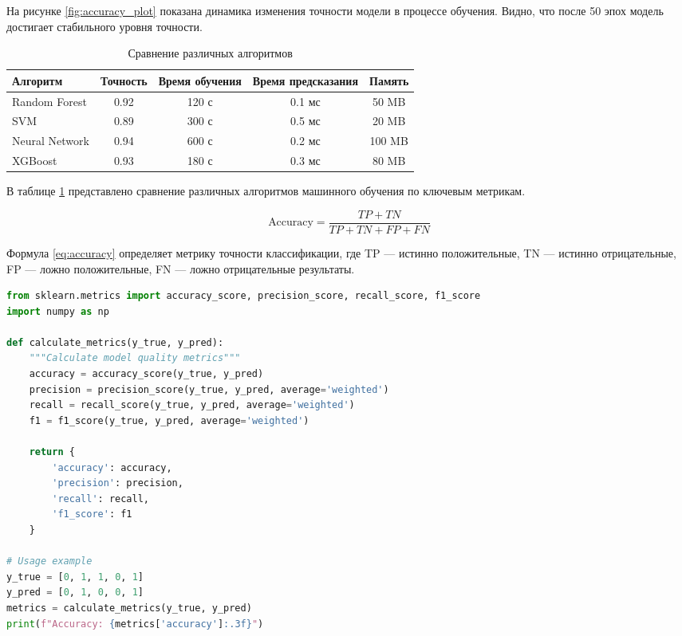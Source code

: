 На рисунке \ref{fig:accuracy_plot} показана динамика изменения точности модели в процессе обучения. Видно, что после 50 эпох модель достигает стабильного уровня точности.

\begin{table}[H]
\centering
\caption{Сравнение различных алгоритмов}
\label{tab:algorithm_comparison}
\begin{tabular}{|l|c|c|c|c|}
\hline
\textbf{Алгоритм} & \textbf{Точность} & \textbf{Время обучения} & \textbf{Время предсказания} & \textbf{Память} \\
\hline
Random Forest & 0.92 & 120 с & 0.1 мс & 50 MB \\
SVM & 0.89 & 300 с & 0.5 мс & 20 MB \\
Neural Network & 0.94 & 600 с & 0.2 мс & 100 MB \\
XGBoost & 0.93 & 180 с & 0.3 мс & 80 MB \\
\hline
\end{tabular}
\end{table}

В таблице \ref{tab:algorithm_comparison} представлено сравнение различных алгоритмов машинного обучения по ключевым метрикам.

\begin{equation}
\text{Accuracy} = \frac{TP + TN}{TP + TN + FP + FN}
\label{eq:accuracy}
\end{equation}

Формула \ref{eq:accuracy} определяет метрику точности классификации, где TP — истинно положительные, TN — истинно отрицательные, FP — ложно положительные, FN — ложно отрицательные результаты.

\begin{lstlisting}[style=code, language=Python, caption={Код для вычисления метрик}, label={lst:metrics_calculation}]
from sklearn.metrics import accuracy_score, precision_score, recall_score, f1_score
import numpy as np

def calculate_metrics(y_true, y_pred):
    """Calculate model quality metrics"""
    accuracy = accuracy_score(y_true, y_pred)
    precision = precision_score(y_true, y_pred, average='weighted')
    recall = recall_score(y_true, y_pred, average='weighted')
    f1 = f1_score(y_true, y_pred, average='weighted')
    
    return {
        'accuracy': accuracy,
        'precision': precision,
        'recall': recall,
        'f1_score': f1
    }

# Usage example
y_true = [0, 1, 1, 0, 1]
y_pred = [0, 1, 0, 0, 1]
metrics = calculate_metrics(y_true, y_pred)
print(f"Accuracy: {metrics['accuracy']:.3f}")
\end{lstlisting}

